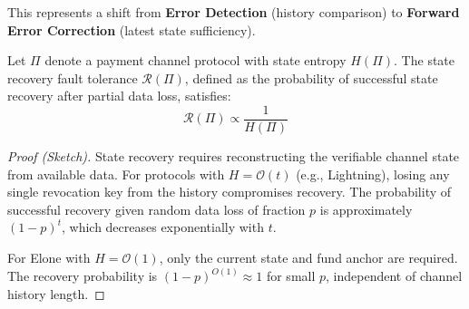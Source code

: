 This represents a shift from \textbf{Error Detection} (history comparison) to \textbf{Forward Error Correction} (latest state sufficiency).

\begin{theorem}
Let $\Pi$ denote a payment channel protocol with state entropy $H(\Pi)$. The state recovery fault tolerance $\mathcal{R}(\Pi)$, defined as the probability of successful state recovery after partial data loss, satisfies:
$$ \mathcal{R}(\Pi) \propto \frac{1}{H(\Pi)} $$
\end{theorem}

\begin{proof}[Proof (Sketch)]
State recovery requires reconstructing the verifiable channel state from available data. For protocols with $H = \mathcal{O}(t)$ (e.g., Lightning), losing any single revocation key from the history compromises recovery. The probability of successful recovery given random data loss of fraction $p$ is approximately $(1-p)^t$, which decreases exponentially with $t$.

For Elone with $H = \mathcal{O}(1)$, only the current state and fund anchor are required. The recovery probability is $(1-p)^{O(1)} \approx 1$ for small $p$, independent of channel history length.
\end{proof}

